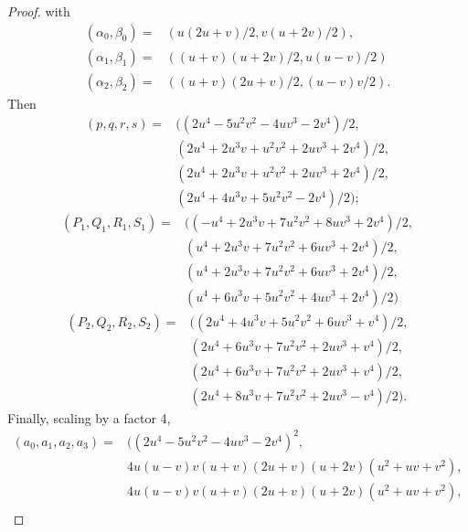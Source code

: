 \documentclass[10pt]{amsart}
\theoremstyle{plain}
\begin{document}
\begin{proof}
with 
\begin{align*}
	(\alpha_0,\beta_0) = & (u(2u+v)/2, v(u+2v)/2), \\
	(\alpha_1,\beta_1) = & ((u+v)(u+2v)/2, u(u-v)/2) \\
	(\alpha_2,\beta_2) = & ((u+v)(2u+v)/2, (u-v)v/2).
\end{align*}
Then
\begin{align*}
	(p,q,r,s) = & ((2u^4 - 5u^2v^2 - 4uv^3 - 2v^4)/2, \\
	& (2u^4 + 2u^3v + u^2v^2 + 2uv^3 + 2v^4)/2, \\
	& (2u^4 + 2u^3v + u^2v^2 + 2uv^3 + 2v^4)/2, \\
	& (2u^4 + 4u^3v + 5u^2v^2 - 2v^4)/2);
\end{align*}
\begin{align*}
	(P_1,Q_1,R_1,S_1) = & ((-u^4 + 2u^3v + 7u^2v^2 + 8uv^3 + 2v^4)/2, \\
	& (u^4 + 2u^3v + 7u^2v^2 + 6uv^3 + 2v^4)/2,  \\
	& (u^4 + 2u^3v + 7u^2v^2 + 6uv^3 + 2v^4)/2, \\
	& (u^4 + 6u^3v + 5u^2v^2 + 4uv^3 + 2v^4)/2)
\end{align*}
\begin{align*}
	(P_2,Q_2,R_2,S_2) = & ((2u^4 + 4u^3v + 5u^2v^2 + 6uv^3 + v^4)/2, \\
	& (2u^4 + 6u^3v + 7u^2v^2 + 2uv^3 + v^4)/2, \\
	& (2u^4 + 6u^3v + 7u^2v^2 + 2uv^3 + v^4)/2, \\
	& (2u^4 + 8u^3v + 7u^2v^2 + 2uv^3 - v^4)/2).
\end{align*}
Finally, scaling by a factor 4, 
\begin{align*}
	(a_0,a_1,a_2,a_3) = &  ( (2u^4 - 5u^2v^2 - 4uv^3 - 2v^4)^2, \\
	& 4u(u - v)v(u + v)(2u + v)(u + 2v)(u^2 + uv + v^2), \\
	& 4u(u - v)v(u + v)(2u + v)(u + 2v)(u^2 + uv + v^2), \\

\end{align*}
\end{proof}
\end{document}
